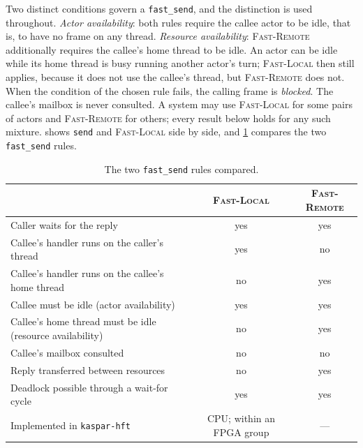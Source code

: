 \documentclass[11pt]{article}
\theoremstyle{definition}
\theoremstyle{remark}
\newcommand{\fs}{\texttt{fast\_send}}
\newcommand{\snd}{\texttt{send}}
\newcommand{\kh}{\texttt{kaspar-hft}}
\begin{document}
Two distinct conditions govern a \fs{}, and the distinction is used throughout.
\emph{Actor availability}: both rules require the callee actor to be idle, that is, to
have no frame on any thread. \emph{Resource availability}: \textsc{Fast-Remote}
additionally requires the callee's home thread to be idle. An actor can be idle while its
home thread is busy running another actor's turn; \textsc{Fast-Local} then still applies,
because it does not use the callee's thread, but \textsc{Fast-Remote} does not. When the
condition of the chosen rule fails, the calling frame is \emph{blocked}. The callee's
mailbox is never consulted. A system may use \textsc{Fast-Local} for some pairs of actors
and \textsc{Fast-Remote} for others; every result below holds for any such mixture.
 shows \snd{} and \textsc{Fast-Local} side by side, and
\cref{tab:fastrules} compares the two \fs{} rules.

\begin{table}[t]
\centering
\caption{The two \fs{} rules compared.}
\label{tab:fastrules}
\small
\begin{tabular}{@{}lcc@{}}
\toprule
& \textsc{Fast-Local} & \textsc{Fast-Remote} \\
\midrule
Caller waits for the reply & yes & yes \\
Callee's handler runs on the caller's thread & yes & no \\
Callee's handler runs on the callee's home thread & no & yes \\
Callee must be idle (actor availability) & yes & yes \\
Callee's home thread must be idle (resource availability) & no & yes \\
Callee's mailbox consulted & no & no \\
Reply transferred between resources & no & yes \\
Deadlock possible through a wait-for cycle & yes & yes \\
Implemented in \kh{} & CPU; within an FPGA group & --- \\
\bottomrule
\end{tabular}
\end{table}
\end{document}

